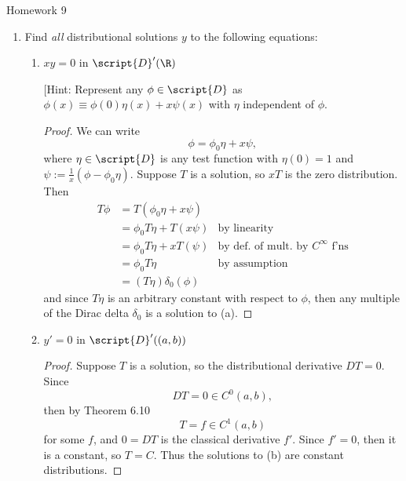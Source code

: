 \documentclass[12pt,letterpaper]{article}
\let\oldphi\phi
\renewcommand{\phi}{\varphi}
\begin{document}
\pagestyle{fancy}
\begin{center}
{\Large Homework 9}%
\end{center}

\renewcommand{\B}{\bar{B}(\ell^\infty)}
\newcommand{\Rn}{\R^n}
\renewcommand{\phi}{\oldphi}
\renewcommand{\S}{\script{S}}
\newcommand{\D}{\script{D}}

\begin{enumerate}
\item Find \textit{all} distributional solutions $y$ to the following equations:
	\begin{enumerate}[label=(\alph*)]
	\item $xy=0$ in $\D'(\R)$ 
	
	[Hint: Represent any $\phi\in\D$ as $\phi(x)\equiv \phi(0)\eta(x)+x\psi(x)$ with $\eta$ independent of $\phi$. 
	
	\begin{proof}
	We can write 
	$$\phi=\phi_0\eta + x\psi,$$
	where $\eta\in\D$ is any test function with $\eta(0)=1$ and $\psi:=\frac{1}{x}(\phi-\phi_0\eta)$. Suppose $T$ is a solution, so $xT$ is the zero distribution. Then 
	\begin{align*}
	T\phi&=T(\phi_0\eta+x\psi) \\
	&= \phi_0T\eta + T(x\psi) & \text{by linearity} \\
	&= \phi_0T\eta + xT(\psi) & \text{by def. of mult. by $C^\infty$ f'ns} \\
	&= \phi_0T\eta & \text{by assumption} \\
	&= (T\eta)\delta_0(\phi)
	\end{align*}
	and since $T\eta$ is an arbitrary constant with respect to $\phi$, then any multiple of the Dirac delta $\delta_0$ is a solution to (a). 
	\end{proof}
	\item $y'=0$ in $\D'((a,b))$
	
	\begin{proof}
	Suppose $T$ is a solution, so the distributional derivative $DT=0$. Since 
	$$DT=0\in C^0(a,b),$$ 
	then by Theorem 6.10 
	$$T=f\in C^1(a,b)$$ 
	for some $f$, and $0=DT$ is the classical derivative $f'$. Since $f'=0$, then it is a constant, so $T=C$. Thus the solutions to (b) are constant distributions. 
	\end{proof}
	\end{enumerate}
	

\end{enumerate}
\end{document}
